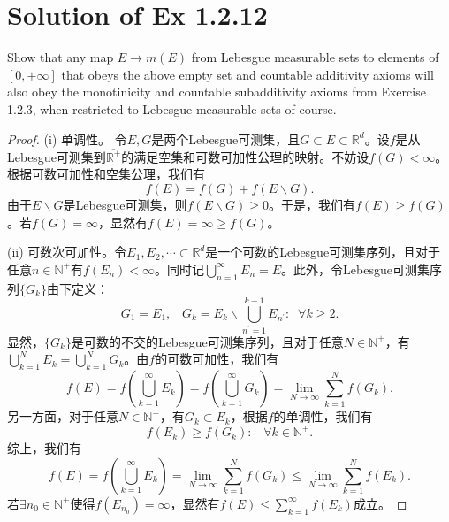 \documentclass[reqno,a4paper,14pt]{amsart}
\begin{document}
\section{Solution of Ex 1.2.12}
Show that any map $E\to m(E)$ from Lebesgue measurable sets to elements of $[0,+\infty]$ that obeys the above empty set and countable additivity axioms will also obey the monotinicity and countable subadditivity axioms from Exercise 1.2.3, when restricted to Lebesgue measurable sets of course.
\begin{proof}
    (i) 单调性。 令$E,G$是两个Lebesgue可测集，且$G\subset E\subset \mathbb{R}^d$。设$f$是从Lebesgue可测集到$\overline{\mathbb{R}^+}$的满足空集和可数可加性公理的映射。不妨设$f(G)<\infty$。根据可数可加性和空集公理，我们有
    \begin{equation*}
        f(E)=f(G)+f(E\backslash G).
    \end{equation*}
    由于$E\backslash G$是Lebesgue可测集，则$f(E\backslash G)\geq 0$。于是，我们有$f(E)\geq f(G)$。若$f(G)=\infty$，显然有$f(E)=\infty\geq f(G)$。

    (ii) 可数次可加性。令$E_1,E_2,\cdots \subset \mathbb{R}^d$是一个可数的Lebesgue可测集序列，且对于任意$n\in\mathbb{N}^+$有$f(E_n)<\infty$。同时记$\bigcup_{n=1}^\infty E_n=E$。此外，令Lebesgue可测集序列$\{G_k\}$由下定义：
    \begin{equation*}
        G_1=E_1,\;\;\; G_k=E_k\backslash\bigcup_{n^\prime=1}^{k-1} E_{n^\prime}:\;\; \forall k\geq 2.
    \end{equation*}
    显然，$\{G_k\}$是可数的不交的Lebesgue可测集序列，且对于任意$N\in \mathbb{N}^+$，有$\bigcup_{k=1}^N E_k=\bigcup_{k=1}^N G_k$。由$f$的可数可加性，我们有
    \begin{equation*}
        f(E)=f(\bigcup_{k=1}^\infty E_k)=f(\bigcup_{k=1}^\infty G_k)=\lim_{N\to\infty}\sum_{k=1}^N f(G_k).
    \end{equation*}
    另一方面，对于任意$N\in \mathbb{N}^+$，有$G_k\subset E_k$，根据$f$的单调性，我们有
    \begin{equation*}
        f(E_k)\geq f(G_k):\;\;\;\forall k\in \mathbb{N}^+.
    \end{equation*}
    综上，我们有
    \begin{equation*}
        f(E)=f(\bigcup_{k=1}^\infty E_k)=\lim_{N\to\infty}\sum_{k=1}^N f(G_k)\leq \lim_{N\to\infty}\sum_{k=1}^N f(E_k).
    \end{equation*}
    若$\exists n_0\in \mathbb{N}^+$使得$f(E_{n_0})=\infty$，显然有$f(E)\leq \sum_{k=1}^\infty f(E_k)$成立。
\end{proof}
\end{document}
